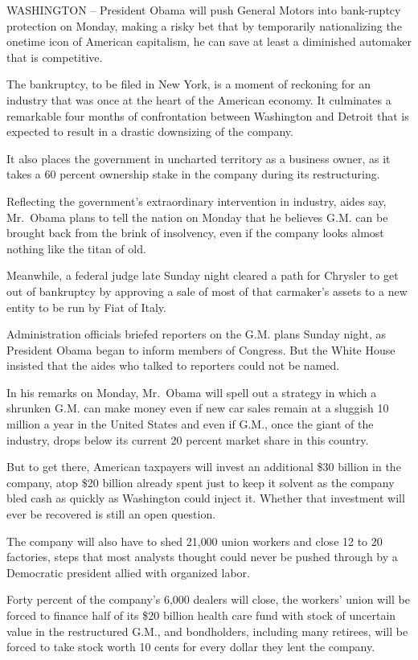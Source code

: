 \documentclass[12pt,a4paper,onecolumn]{article}
\begin{document}
WASHINGTON -- President Obama will push General Motors into bank-ruptcy protection on Monday, making
a risky bet that by temporarily nationalizing the onetime icon of American capitalism, he can save
at least a diminished automaker that is competitive.

The bankruptcy, to be filed in New York, is a moment of reckoning for an industry that was once at
the heart of the American economy. It culminates a remarkable four months of confrontation between
Washington and Detroit that is expected to result in a drastic downsizing of the company.

It also places the government in uncharted territory as a business owner, as it takes a 60 percent
ownership stake in the company during its restructuring.

Reflecting the government's extraordinary intervention in industry, aides say, Mr.~Obama plans to
tell the nation on Monday that he believes G.M. can be brought back from the brink of insolvency,
even if the company looks almost nothing like the titan of old.

Meanwhile, a federal judge late Sunday night cleared a path for Chrysler to get out of bankruptcy by
approving a sale of most of that carmaker's assets to a new entity to be run by Fiat of Italy.

Administration officials briefed reporters on the G.M. plans Sunday night, as President Obama began
to inform members of Congress. But the White House insisted that the aides who talked to reporters
could not be named.

In his remarks on Monday, Mr.~Obama will spell out a strategy in which a shrunken G.M. can make
money even if new car sales remain at a sluggish 10 million a year in the United States and even if
G.M., once the giant of the industry, drops below its current 20 percent market share in this
country.

But to get there, American taxpayers will invest an additional \$30 billion in the company, atop
\$20 billion already spent just to keep it solvent as the company bled cash as quickly as Washington
could inject it. Whether that investment will ever be recovered is still an open question.

The company will also have to shed 21,000 union workers and close 12 to 20 factories, steps that
most analysts thought could never be pushed through by a Democratic president allied with organized
labor.

Forty percent of the company's 6,000 dealers will close, the workers' union will be forced to
finance half of its \$20 billion health care fund with stock of uncertain value in the restructured
G.M., and bondholders, including many retirees, will be forced to take stock worth 10 cents for
every dollar they lent the company.
\end{document}
